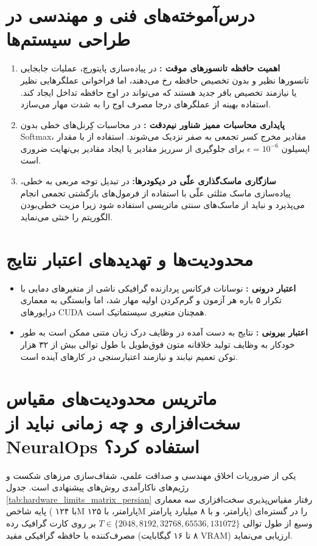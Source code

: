 \documentclass[12pt,a4paper]{report}
\theoremstyle{definition}
\begin{document}
\section{درس‌آموخته‌های فنی و مهندسی در طراحی سیستم‌ها}
\begin{enumerate}
    \item \textbf{اهمیت حافظه تانسورهای موقت :} در پیاده‌سازی پایتورچ، عملیات جابجایی تانسورها نظیر  و  بدون تخصیص حافظه رخ می‌دهند، اما فراخوانی عملگرهایی نظیر  یا  نیازمند تخصیص بافر جدید هستند که می‌تواند در اوج حافظه تداخل ایجاد کند. استفاده بهینه از عملگرهای درجا  مصرف اوج را به شدت مهار می‌سازد.
    \item \textbf{پایداری محاسبات ممیز شناور نیم‌دقت :} در محاسبات کِرنل‌های خطی بدون Softmax، مقادیر مخرج کسر تجمعی به صفر نزدیک می‌شوند. استفاده از  با مقدار اپسیلون $\epsilon = 10^{-6}$ برای جلوگیری از سرریز مقادیر یا ایجاد مقادیر بی‌نهایت ضروری است.
    \item \textbf{سازگاری ماسک‌گذاری علّی در دیکودرها:} در تبدیل توجه مربعی به خطی، پیاده‌سازی ماسک مثلثی علّی با استفاده از فرمول‌های بازگشتی تجمعی  انجام می‌پذیرد و نباید از ماسک‌های سنتی ماتریسی استفاده شود زیرا مزیت خطی‌بودن الگوریتم را خنثی می‌نماید.
\end{enumerate}

\section{محدودیت‌ها و تهدیدهای اعتبار نتایج }
\begin{itemize}
    \item \textbf{اعتبار درونی :} نوسانات فرکانس پردازنده گرافیکی ناشی از متغیرهای دمایی با تکرار ۵ باره هر آزمون و گرم‌کردن اولیه  مهار شد، اما وابستگی به معماری درایورهای CUDA همچنان متغیری سیستماتیک است.
    \item \textbf{اعتبار بیرونی :} نتایج به دست آمده در وظایف درک زبان متنی  ممکن است به طور خودکار به وظایف تولید خلاقانه متون فوق‌طویل  با طول توالی بیش از ۳۲ هزار توکن تعمیم نیابند و نیازمند اعتبارسنجی در کارهای آینده است.
\end{itemize}

\section{ماتریس محدودیت‌های مقیاس سخت‌افزاری و چه زمانی نباید از NeuralOps استفاده کرد؟}
\label{sec:hardware_limitations_persian}
یکی از ضروریات اخلاق مهندسی و صداقت علمی، شفاف‌سازی مرزهای شکست و رژیم‌های ناکارآمدی روش‌های پیشنهادی است. جدول \ref{tab:hardware_limits_matrix_persian} رفتار مقیاس‌پذیری سخت‌افزاری سه معماری پایه شاخص ( با ۱۲۴M پارامتر،  با ۱۲۵M پارامتر، و  با ۸ میلیارد پارامتر) را در گستره‌ای وسیع از طول توالی $T \in \{2048, 8192, 32768, 65536, 131072\}$ بر روی کارت گرافیک رده مصرف‌کننده با حافظه گرافیکی مقید (۸ تا ۱۶ گیگابایت VRAM) ارزیابی می‌نماید.
\end{document}
